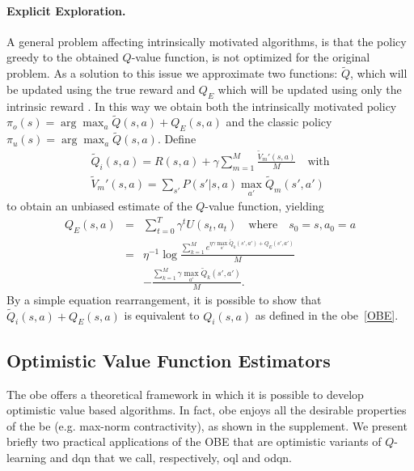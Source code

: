 \paragraph{Explicit Exploration.} A general problem affecting intrinsically motivated algorithms, is that the policy greedy to the obtained $Q$-value function, is not optimized for the original problem. As a solution to this issue we approximate two functions: $\tilde{Q}$, which will be updated using the true reward and $Q_E$ which will be updated using only the intrinsic reward \cite{szita2008many}. In this way we obtain both the intrinsically motivated policy $\pi_o(s) = \arg \max_{a} \tilde{Q}(s,a) + Q_E(s,a)$ and the classic policy  $\pi_u(s) = \arg \max_{a} \tilde{Q}(s,a)$.
Define 
\begin{eqnarray}
	\tilde{Q}_i(s,a) = R(s,a) + \gamma \sum_{m=1}^M\frac{\tilde{V}_m'(s,a)}{M} \quad \text{with} \\
	\tilde{V}_m'(s,a) =  \sum_{s'} P(s'|s,a)\max_{a'}\tilde{Q}_m(s',a')
\end{eqnarray}
to obtain an unbiased estimate of the $Q$-value function, yielding
\begin{eqnarray}
Q_E(s,a) & = & \sum_{t=0}^T \gamma^t U(s_t,a_t) \quad \text{where} \quad s_0 = s, a_0 = a \nonumber \\
& = & \eta^{-1}\log \frac{\sum_{k=1}^M e^{\eta\gamma\max_{a'}\tilde{Q}_k(s',a') + Q_E(s',a')}}{M}\nonumber \\
& &  -  \frac{\sum_{k=1}^M \gamma\max_{a'}\tilde{Q}_k(s',a')}{M}.
\end{eqnarray}
By a simple equation rearrangement, it is possible to show that $\tilde{Q}_i(s,a) + Q_E(s,a)$ is equivalent to $Q_i(s,a)$ as defined in the \gls{obe}~\ref{OBE}. 
 
\subsection{Optimistic Value Function Estimators}
The \gls{obe} offers a theoretical framework in which it is possible to develop optimistic value based algorithms. In fact, \gls{obe} enjoys all the desirable properties of the \gls{be} (e.g. max-norm contractivity), as shown in the supplement. We present briefly two practical applications of the OBE that are optimistic variants of $Q$-learning and \gls{dqn} that we call, respectively, \gls{oql} and \gls{odqn}.
